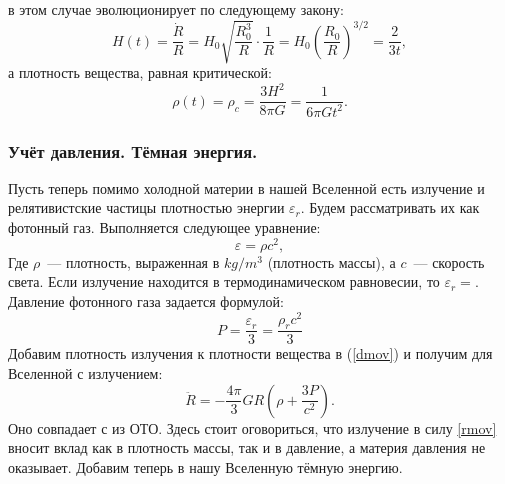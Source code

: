  в этом случае эволюционирует по следующему закону:
\begin{equation}
H(t) = \frac{\dot{R}}{R} = H_0 \sqrt{\frac{R_{0}^{3}}{R}} \cdot \frac{1}{R} = H_0 \left(\frac{R_{0}}{R}\right)^{3/2} = \frac{2}{3t},
\end{equation}
а плотность вещества, равная критической:
\begin{equation}
\rho(t) = \rho_c = \frac{3 H^2}{8 \pi G} = \frac{1}{6 \pi G t^2}.
\end{equation}

\subsubsection{Учёт давления. Тёмная энергия.}
Пусть теперь помимо холодной материи в нашей Вселенной есть излучение и релятивистские частицы плотностью энергии $\varepsilon_r$. Будем рассматривать их как фотонный газ. Выполняется следующее уравнение:
\begin{equation}
\varepsilon = \rho c^2,
\label{albert}
\end{equation}
Где $\rho$~--- плотность, выраженная в $kg/m^3$ (плотность массы), а $c$~--- скорость света. Если излучение находится в термодинамическом равновесии, то $\varepsilon_r = $. Давление фотонного газа задается формулой:
$$
P = \frac{\varepsilon_r}{3} = \frac{\rho_r c^2}{3}
$$
Добавим плотность излучения к плотности вещества в (\ref{dmov}) и получим  для Вселенной с излучением:
\begin{equation}
\ddot{R} = -\frac{4 \pi}{3} G R \left( \rho + \frac{3P}{c^2} \right).
\label{rmov}
\end{equation}
Оно совпадает с  из ОТО. Здесь стоит оговориться, что излучение в силу \eqref{rmov} вносит вклад как в плотность массы, так и в давление, а  материя давления не оказывает. Добавим теперь в нашу Вселенную тёмную энергию.

